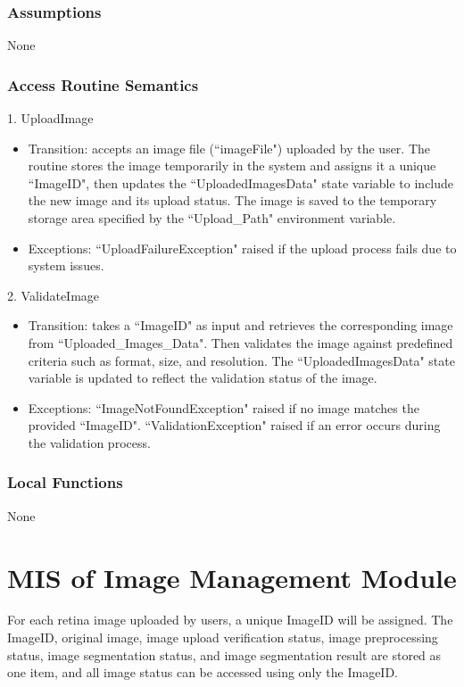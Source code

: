 \documentclass[12pt, titlepage]{article}
\begin{document}
\subsubsection{Assumptions}

None

\subsubsection{Access Routine Semantics}
1. UploadImage
\begin{itemize}
    \item Transition: accepts an image file (``imageFile") uploaded by the user. The routine stores the image temporarily in the system and assigns it a unique ``ImageID", then updates the ``UploadedImagesData" state variable to include the new image and its upload status. The image is saved to the temporary storage area specified by the ``Upload\_Path" environment variable.
    \item Exceptions: ``UploadFailureException" raised if the upload process fails due to system issues.
\end{itemize}
2. ValidateImage
\begin{itemize}
    \item Transition: takes a ``ImageID" as input and retrieves the corresponding image from ``Uploaded\_Images\_Data". Then validates the image against predefined criteria such as format, size, and resolution. The ``UploadedImagesData" state variable is updated to reflect the validation status of the image.
    \item Exceptions: ``ImageNotFoundException" raised if no image matches the provided ``ImageID". ``ValidationException" raised if an error occurs during the validation process.
\end{itemize}

\subsubsection{Local Functions}

None



\newpage

\section{MIS of Image Management Module} \label{m2} 
For each retina image uploaded by users, a unique ImageID will be assigned. The ImageID, original image, image upload verification status, image preprocessing status, image segmentation status, and image segmentation result are stored as one item, and all image status can be accessed using only the ImageID.
\end{document}
